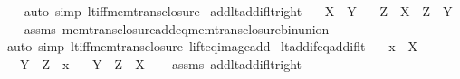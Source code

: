\begin{isabellebody}
\ \ \isamarkupfalse%
\ {\isacharparenleft}{\kern0pt}auto\ simp{\isacharcolon}{\kern0pt}\ lt{\isacharunderscore}{\kern0pt}iff{\isacharunderscore}{\kern0pt}mem{\isacharunderscore}{\kern0pt}trans{\isacharunderscore}{\kern0pt}closure{\isacharparenright}{\kern0pt}%
\endisatagproof
{\isafoldproof}%
%
\isadelimproof
\isanewline
%
\endisadelimproof
\isanewline
{}\isamarkupfalse%
\ add{\isacharunderscore}{\kern0pt}lt{\isacharunderscore}{\kern0pt}add{\isacharunderscore}{\kern0pt}if{\isacharunderscore}{\kern0pt}lt{\isacharunderscore}{\kern0pt}right{\isacharcolon}{\kern0pt}\isanewline
\ \ \ {\isachardoublequoteopen}X\ {\isacharless}{\kern0pt}\ Y{\isachardoublequoteclose}\isanewline
\ \ \ {\isachardoublequoteopen}Z\ {\isacharplus}{\kern0pt}\ X\ {\isacharless}{\kern0pt}\ Z\ {\isacharplus}{\kern0pt}\ Y{\isachardoublequoteclose}\isanewline
%
\isadelimproof
\ \ %
\endisadelimproof
%
\isatagproof
{}\isamarkupfalse%
\ assms\ mem{\isacharunderscore}{\kern0pt}trans{\isacharunderscore}{\kern0pt}closure{\isacharunderscore}{\kern0pt}add{\isacharunderscore}{\kern0pt}eq{\isacharunderscore}{\kern0pt}mem{\isacharunderscore}{\kern0pt}trans{\isacharunderscore}{\kern0pt}closure{\isacharunderscore}{\kern0pt}bin{\isacharunderscore}{\kern0pt}union\isanewline
\ \ \isamarkupfalse%
\ {\isacharparenleft}{\kern0pt}auto\ simp{\isacharcolon}{\kern0pt}\ lt{\isacharunderscore}{\kern0pt}iff{\isacharunderscore}{\kern0pt}mem{\isacharunderscore}{\kern0pt}trans{\isacharunderscore}{\kern0pt}closure\ lift{\isacharunderscore}{\kern0pt}eq{\isacharunderscore}{\kern0pt}image{\isacharunderscore}{\kern0pt}add{\isacharparenright}{\kern0pt}%
\endisatagproof
{\isafoldproof}%
%
\isadelimproof
\isanewline
%
\endisadelimproof
\isanewline
{}\isamarkupfalse%
\ lt{\isacharunderscore}{\kern0pt}add{\isacharunderscore}{\kern0pt}if{\isacharunderscore}{\kern0pt}eq{\isacharunderscore}{\kern0pt}add{\isacharunderscore}{\kern0pt}if{\isacharunderscore}{\kern0pt}lt{\isacharcolon}{\kern0pt}\isanewline
\ \ \ {\isachardoublequoteopen}x\ {\isacharless}{\kern0pt}\ X{\isachardoublequoteclose}\isanewline
\ \ \ {\isachardoublequoteopen}Y\ {\isacharequal}{\kern0pt}\ Z\ {\isacharplus}{\kern0pt}\ x{\isachardoublequoteclose}\isanewline
\ \ \ {\isachardoublequoteopen}Y\ {\isacharless}{\kern0pt}\ Z\ {\isacharplus}{\kern0pt}\ X{\isachardoublequoteclose}\isanewline
%
\isadelimproof
\ \ %
\endisadelimproof
%
\isatagproof
{}\isamarkupfalse%
\ assms\ add{\isacharunderscore}{\kern0pt}lt{\isacharunderscore}{\kern0pt}add{\isacharunderscore}{\kern0pt}if{\isacharunderscore}{\kern0pt}lt{\isacharunderscore}{\kern0pt}right\ \isamarkupfalse%

\end{isabellebody}
